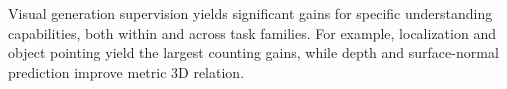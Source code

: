 \begin{findingbox}
Visual generation supervision yields significant gains for specific understanding capabilities, both within and across task families.
For example, localization and object pointing yield the largest counting gains, while depth and surface-normal prediction improve metric 3D relation.
\end{findingbox}
